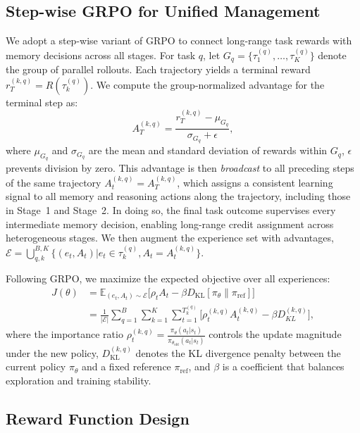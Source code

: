 \subsection{Step-wise GRPO for Unified Management}

We adopt a step-wise variant of GRPO to connect long-range task rewards with memory decisions across all stages.
For task $q$, let $G_q = \{\tau_1^{(q)},\ldots,\tau_K^{(q)}\}$ denote the group of parallel rollouts.
Each trajectory yields a terminal reward $r_T^{(k,q)} = R(\tau_k^{(q)})$. We compute the group-normalized advantage for the terminal step as:
\begin{equation}
    A_T^{(k,q)} = \frac{r_T^{(k,q)} - \mu_{G_q}}{\sigma_{G_q} + \epsilon},
\end{equation}
where $\mu_{G_q}$ and $\sigma_{G_q}$ are the mean and standard deviation of rewards within $G_q$, $\epsilon$ prevents division by zero. This advantage is then \emph{broadcast} to all preceding steps of the same trajectory $A_t^{(k,q)} = A_T^{(k,q)}$,
which assigns a consistent learning signal to all memory and reasoning actions along the trajectory, including those in Stage~1 and Stage~2. 
In doing so, the final task outcome supervises every intermediate memory decision, enabling long-range credit assignment across heterogeneous stages. We then augment the experience set with advantages, $\mathcal{E} = \bigcup_{q,k}^{B,K} \{ (e_t, A_t) | e_t \in \tau_k^{(q)},A_t=A_t^{(k,q)} \}$. 

Following GRPO, we maximize the expected objective over all experiences:
\begin{equation}
\begin{aligned}
    J(\theta) &= \mathbb{E}_{(e_t, A_t) \sim \mathcal{E}} \big[\rho_t A_t - \beta D_{\text{KL}}[\pi_{\theta}\|\pi_{\text{ref}}] \big] \\
    &= \frac{1}{|\mathcal{E}|} \sum_{q=1}^{B} \sum_{k=1}^{K} \sum_{t=1}^{T_k^{(q)}} \big[\rho_t^{(k,q)} A_t^{(k,q)} - \beta D_{KL}^{(k,q)} \big],
\end{aligned}
\end{equation}
where the importance ratio 
$\rho_t^{(k,q)} = \frac{\pi_\theta(a_t| s_t)}{\pi_{\theta_{\text{old}}}(a_t |s_t)}$ 
controls the update magnitude under the new policy, 
$D_{\text{KL}}^{(k,q)}$ denotes the KL divergence penalty between the current policy $\pi_\theta$ and a fixed reference $\pi_{\text{ref}}$, 
and $\beta$ is a coefficient that balances exploration and training stability.

\subsection{Reward Function Design}

